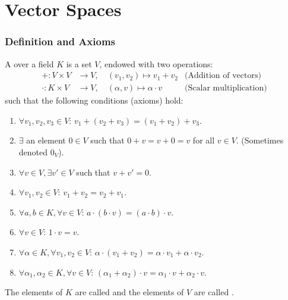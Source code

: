 \renewcommand{\thetheorem}{7.\arabic{theorem}}
\setcounter{theorem}{0}
\setcounter{chapter}{6}
%

\chapter{Vector Spaces}

\subsection{Definition and Axioms}

\begin{definition}
\label{def:vector_space}
A  over a field $K$ is a set $V$, endowed with two operations:
\begin{align*}
+: V \times V &\longrightarrow V, \quad (v_1, v_2) \mapsto v_1 + v_2  &\text{(Addition of vectors)} \\
\cdot: K \times V &\longrightarrow V, \quad (\alpha, v) \mapsto \alpha \cdot v  &\text{(Scalar multiplication)}
\end{align*}
such that the following conditions (axioms) hold:
\begin{enumerate}[label=(\textbf{V}\arabic*), leftmargin=3.5em]
    \item $\forall v_1, v_2, v_3 \in V$: $v_1 + (v_2 + v_3) = (v_1 + v_2) + v_3$.
    \item $\exists$ an element $0 \in V$ such that $0 + v = v + 0 = v$ for all $v \in V$. (Sometimes denoted $0_V$).
    \item $\forall v \in V, \exists v' \in V$ such that $v + v' = 0$.
    \item $\forall v_1, v_2 \in V$: $v_1 + v_2 = v_2 + v_1$.
    \item $\forall a, b \in K, \forall v \in V$: $a \cdot (b \cdot v) = (a \cdot b) \cdot v$.
    \item $\forall v \in V$: $1 \cdot v = v$.
    \item $\forall \alpha \in K, \forall v_1, v_2 \in V$: $\alpha \cdot (v_1 + v_2) = \alpha \cdot v_1 + \alpha \cdot v_2$.
    \item $\forall \alpha_1, \alpha_2 \in K, \forall v \in V$: $(\alpha_1 + \alpha_2) \cdot v = \alpha_1 \cdot v + \alpha_2 \cdot v$.
\end{enumerate}
The elements of $K$ are called  and the elements of $V$ are called .
\end{definition}

